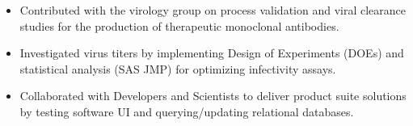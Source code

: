 \documentclass[10pt,a4paper]{altacv}
\begin{document}





\begin{itemize}
    \item   \small{Contributed with the virology group on process validation and viral clearance studies for the production of therapeutic monoclonal antibodies.}
    \item   \small{Investigated virus titers by implementing Design of Experiments (DOEs) and statistical analysis (SAS JMP) for optimizing infectivity assays.}
\end{itemize}

\medskip



\begin{itemize}
    \item   \small{Collaborated with Developers and Scientists to deliver product suite solutions by testing software UI and querying/updating relational databases.}
\end{itemize}

\medskip


\end{document}
